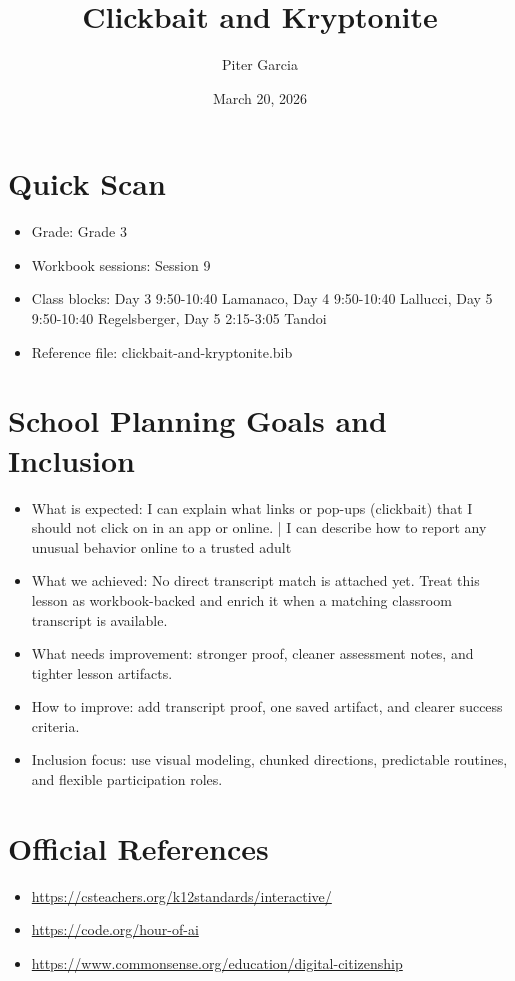 \documentclass[11pt]{article}
\title{Clickbait and Kryptonite}
\author{Piter Garcia}
\date{March 20, 2026}
\begin{document}
    \maketitle
    \section*{Quick Scan}
    \begin{itemize}[leftmargin=*]
    \item Grade: Grade 3
    \item Workbook sessions: Session 9
    \item Class blocks: Day 3 9:50-10:40 Lamanaco, Day 4 9:50-10:40 Lallucci, Day 5 9:50-10:40 Regelsberger, Day 5 2:15-3:05 Tandoi
    \item Reference file: clickbait-and-kryptonite.bib
    \end{itemize}
    \section*{School Planning Goals and Inclusion}
    \begin{itemize}[leftmargin=*]
    \item What is expected: I can explain what links or pop-ups (clickbait) that I should not click on in an app or online. | I can describe how to report any unusual behavior online to a trusted adult
    \item What we achieved: No direct transcript match is attached yet. Treat this lesson as workbook-backed and enrich it when a matching classroom transcript is available.
    \item What needs improvement: stronger proof, cleaner assessment notes, and tighter lesson artifacts.
    \item How to improve: add transcript proof, one saved artifact, and clearer success criteria.
    \item Inclusion focus: use visual modeling, chunked directions, predictable routines, and flexible participation roles.
    \end{itemize}
    \section*{Official References}
    \begin{itemize}[leftmargin=*]
    \item \url{https://csteachers.org/k12standards/interactive/}
\item \url{https://code.org/hour-of-ai}
\item \url{https://www.commonsense.org/education/digital-citizenship}

    \end{itemize}
    
\end{document}
